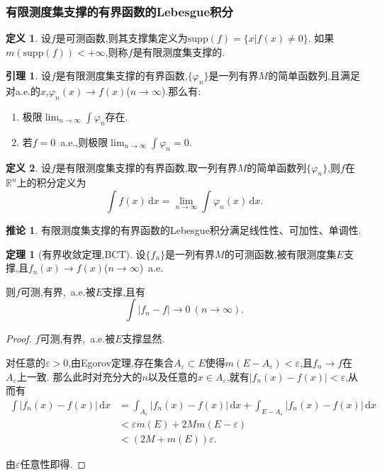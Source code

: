\documentclass{ctexart}
\theoremstyle{definition}
\newtheorem{definition}{定义}
\newtheorem{lemma}{引理}
\newtheorem{theorem}{定理}
\newtheorem{corollary}{推论}
\theoremstyle{remark}
\begin{document}
	\subsubsection{有限测度集支撑的有界函数的Lebesgue积分}
	\begin{definition}
		设$f$是可测函数,则其支撑集定义为$\mathrm{supp}(f)=\{x|f(x)\ne 0\}$.
		如果$m(\mathrm{supp}(f))<+\infty$,则称$f$是有限测度集支撑的.
	\end{definition}
	\begin{lemma}
		设$f$是有限测度集支撑的有界函数,$\{\varphi_n\}$是一列有界$M$的简单函数列,且满足对a.e.的$x$,$\varphi_n(x)\to f(x)$($n\to\infty$).那么有:
		\begin{enumerate}
			\item 极限$\lim_{n\to\infty}{\int{\varphi_n}}$存在.
			\item 若$f=0$\ a.e.,则极限$\lim_{n\to\infty}{\int{\varphi_n}}=0$.
		\end{enumerate}
	\end{lemma}
	\begin{definition}
		设$f$是有限测度集支撑的有界函数,取一列有界$M$的简单函数列$\{\varphi_n\}$,则$f$在$\mathbb{R}^n$上的积分定义为
		$$\int{f(x)\,\mathrm{d}x}=\lim_{n\to\infty}{\int{\varphi_n(x)\,\mathrm{d}x}}.$$
	\end{definition}
	\begin{corollary}
		有限测度集支撑的有界函数的Lebesgue积分满足线性性、可加性、单调性.
	\end{corollary}
	
	\begin{theorem}[有界收敛定理,BCT]
		设$\{f_n\}$是一列有界$M$的可测函数,被有限测度集$E$支撑,且$f_n(x)\to f(x)$($n\to\infty$)\ a.e.
		
		则$f$可测,有界,\ a.e.被$E$支撑,且有
		$$\int{|f_n-f|}\to 0\ (n\to\infty).$$
	\end{theorem}
	\begin{proof}
		$f$可测,有界,\ a.e.被$E$支撑显然.
		
		对任意的$\varepsilon>0$,由Egorov定理,存在集合$A_\varepsilon\subset E$使得$m(E-A_\varepsilon)<\varepsilon$,且$f_n\to f$在$A_\varepsilon$上一致.
		那么此时对充分大的$n$以及任意的$x\in A_\varepsilon$,就有$|f_n(x)-f(x)|<\varepsilon$,从而有
		\begin{align*}
			\int{|f_n(x)-f(x)|\,\mathrm{d}x}
			& = \int_{A_\varepsilon}{|f_n(x)-f(x)|\,\mathrm{d}x}+\int_{E-A_\varepsilon}{|f_n(x)-f(x)|\,\mathrm{d}x} \\
			& < \varepsilon m(E)+2Mm(E-\varepsilon) \\
			& < (2M+m(E))\varepsilon.
		\end{align*}
		
		由$\varepsilon$任意性即得.
	\end{proof}
	
\end{document}
